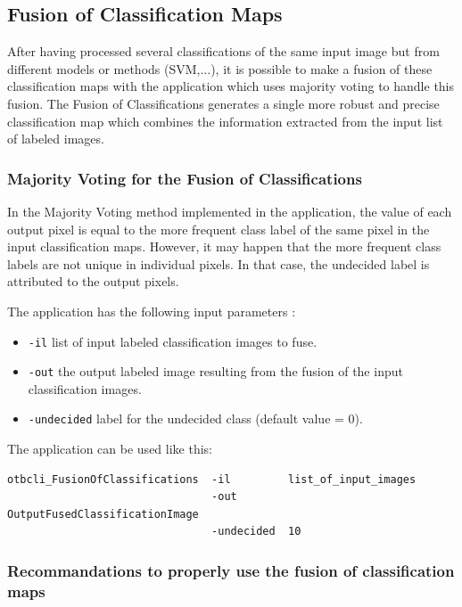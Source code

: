 \subsection{Fusion of Classification Maps}\label{ssec:fusionofclassifications}

After having processed several classifications of the same input image but from different models or methods (SVM,...),
it is possible to make a fusion of these classification maps with the  application which uses majority voting to handle
this fusion. The Fusion of Classifications generates a single more robust and precise classification map which combines the information extracted from the input
list of labeled images. 

\subsubsection{Majority Voting for the Fusion of Classifications}

In the Majority Voting method implemented in the  application, the value of each output pixel is equal to the more frequent
class label of the same pixel in the input classification maps. However, it may happen that the more frequent class labels are not unique in individual pixels. In that case,
the undecided label is attributed to the output pixels.


 
The  application has the following input parameters :
\begin{itemize}
\item \verb?-il? list of input labeled classification images to fuse.
\item \verb?-out? the output labeled image resulting from the fusion of the input classification images.
\item \verb?-undecided? label for the undecided class (default value = 0).
\end{itemize}


The application can be used like this:
\begin{verbatim}
otbcli_FusionOfClassifications  -il         list_of_input_images
                                -out        OutputFusedClassificationImage
                                -undecided  10
\end{verbatim}
 

\subsubsection{Recommandations to properly use the fusion of classification maps}

